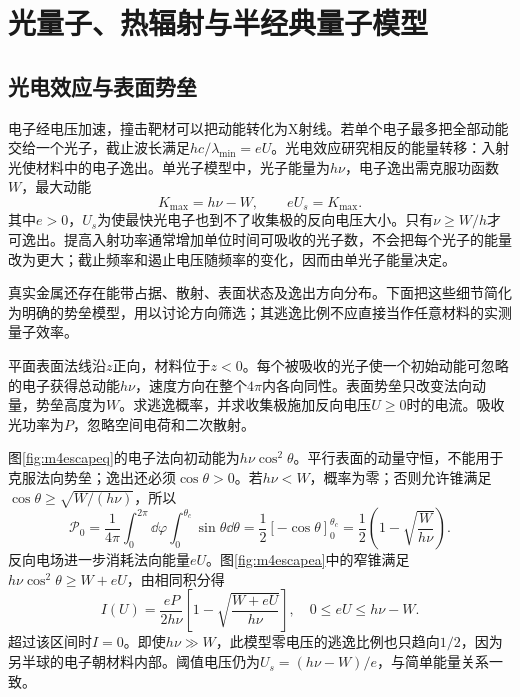 \chapter{光量子、热辐射与半经典量子模型}
\section{光电效应与表面势垒}\label{th:m4photo}
电子经电压加速，撞击靶材可以把动能转化为X射线。若单个电子最多把全部动能交给一个光子，截止波长满足$hc/\lambda_{\min}=eU$。光电效应研究相反的能量转移：入射光使材料中的电子逸出。单光子模型中，光子能量为$h\nu$，电子逸出需克服功函数$W$，最大动能
\[
 K_{\max}=h\nu-W,\qquad eU_s=K_{\max}.
\]
其中$e>0$，$U_s$为使最快光电子也到不了收集极的反向电压大小。只有$\nu\geq W/h$才可逸出。提高入射功率通常增加单位时间可吸收的光子数，不会把每个光子的能量改为更大；截止频率和遏止电压随频率的变化，因而由单光子能量决定。

真实金属还存在能带占据、散射、表面状态及逸出方向分布。下面把这些细节简化为明确的势垒模型，用以讨论方向筛选；其逃逸比例不应直接当作任意材料的实测量子效率。

\begin{example}\label{ex:m4escape}
平面表面法线沿$z$正向，材料位于$z<0$。每个被吸收的光子使一个初始动能可忽略的电子获得总动能$h\nu$，速度方向在整个$4\pi$内各向同性。表面势垒只改变法向动量，势垒高度为$W$。求逃逸概率，并求收集极施加反向电压$U\geq0$时的电流。吸收光功率为$P$，忽略空间电荷和二次散射。
\end{example}
\begin{solution}
图\ref{fig:m4escapeq}的电子法向初动能为$h\nu\cos^2\theta$。平行表面的动量守恒，不能用于克服法向势垒；逸出还必须$\cos\theta>0$。若$h\nu<W$，概率为零；否则允许锥满足$\cos\theta\geq\sqrt{W/(h\nu)}$，所以
\[
 \mathcal P_0=\frac1{4\pi}\int_0^{2\pi}\dd\varphi
 \int_0^{\theta_c}\sin\theta\dd\theta
 =\frac12[-\cos\theta]_0^{\theta_c}
 =\frac12\left(1-\sqrt{\frac W{h\nu}}\right).
\]
反向电场进一步消耗法向能量$eU$。图\ref{fig:m4escapea}中的窄锥满足$h\nu\cos^2\theta\geq W+eU$，由相同积分得
\[
 I(U)=\frac{eP}{2h\nu}
 \left[1-\sqrt{\frac{W+eU}{h\nu}}\right],\quad
 0\leq eU\leq h\nu-W.
\]
超过该区间时$I=0$。即使$h\nu\gg W$，此模型零电压的逃逸比例也只趋向$1/2$，因为另半球的电子朝材料内部。阈值电压仍为$U_s=(h\nu-W)/e$，与简单能量关系一致。
\end{solution}

